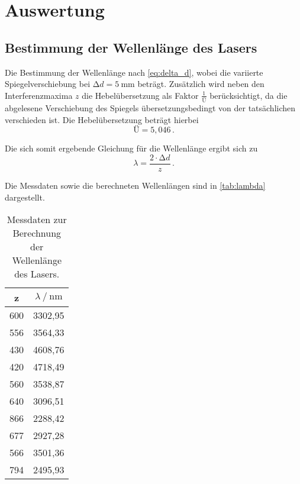 \section{Auswertung}
\label{sec:Auswertung}

\subsection{Bestimmung der Wellenlänge des Lasers}

Die Bestimmung der Wellenlänge nach \autoref{eq:delta_d}, 
wobei die variierte Spiegelverschiebung bei $\increment d = \qty{5}{\milli\meter}$ beträgt.
Zusätzlich wird neben den Interferenzmaxima $z$ die Hebelübersetzung als Faktor $\frac{1}{Ü}$ berücksichtigt,
da die abgelesene Verschiebung des Spiegels übersetzungsbedingt von der tatsächlichen verschieden ist.
Die Hebelübersetzung beträgt hierbei 
\begin{equation*}
    Ü = 5,046 \, .
\end{equation*}

Die sich somit ergebende Gleichung für die Wellenlänge ergibt sich zu
\begin{equation} \label{eq:lambda}
    \lambda = \frac{2 \cdot \increment d}{z} \, .
\end{equation}

Die Messdaten sowie die berechneten Wellenlängen sind in \autoref{tab:lambda} dargestellt.
\begin{table}
    \centering
    \caption{Messdaten zur Berechnung der Wellenlänge des Lasers.}
    \label{tab:lambda}
    \begin{tabular}{c c}
        \toprule
        z &  $\lambda \mathbin{/} \mathrm{nm}$ \\
        \midrule
        600 & 3302,95 \\
        556 & 3564,33 \\
        430 & 4608,76 \\
        420 & 4718,49 \\
        560 & 3538,87 \\
        640 & 3096,51 \\
        866 & 2288,42 \\
        677 & 2927,28 \\
        566 & 3501,36 \\
        794 & 2495,93 \\
        \bottomrule
    \end{tabular}
\end{table}


